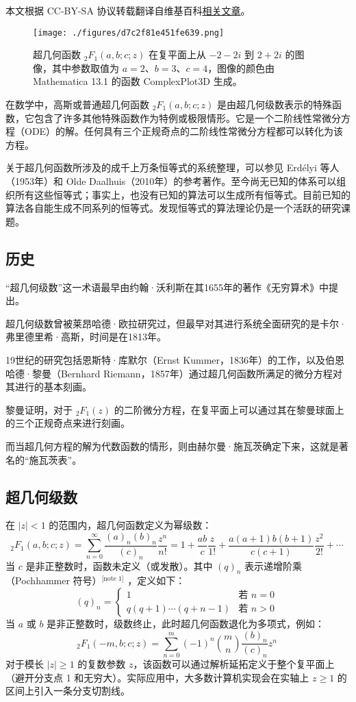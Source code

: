 
本文根据 CC-BY-SA 协议转载翻译自维基百科\href{https://en.wikipedia.org/wiki/Hypergeometric_function}{相关文章}。

\begin{figure}[ht]
\centering
\texttt{[image: ./figures/d7c2f81e451fe639.png]}
\caption{超几何函数 ${}_2F_1(a, b; c; z)$ 在复平面上从 $-2 - 2i$ 到 $2 + 2i$ 的图像，其中参数取值为 $a = 2$、$b = 3$、$c = 4$，图像的颜色由 Mathematica 13.1 的函数 ComplexPlot3D 生成。} \label{fig_CJHhs_1}
\end{figure}
在数学中，高斯或普通超几何函数 ${}_2F_1(a,b;c;z)$ 是由超几何级数表示的特殊函数，它包含了许多其他特殊函数作为特例或极限情形。它是一个二阶线性常微分方程（ODE）的解。任何具有三个正规奇点的二阶线性常微分方程都可以转化为该方程。

关于超几何函数所涉及的成千上万条恒等式的系统整理，可以参见 Erdélyi 等人（1953年）和 Olde Daalhuis（2010年）的参考著作。至今尚无已知的体系可以组织所有这些恒等式；事实上，也没有已知的算法可以生成所有恒等式。目前已知的算法各自能生成不同系列的恒等式。发现恒等式的算法理论仍是一个活跃的研究课题。
\subsection{历史}
“超几何级数”这一术语最早由约翰·沃利斯在其1655年的著作《无穷算术》中提出。

超几何级数曾被莱昂哈德·欧拉研究过，但最早对其进行系统全面研究的是卡尔·弗里德里希·高斯，时间是在1813年。

19世纪的研究包括恩斯特·库默尔（Ernst Kummer，1836年）的工作，以及伯恩哈德·黎曼（Bernhard Riemann，1857年）通过超几何函数所满足的微分方程对其进行的基本刻画。

黎曼证明，对于 ${}_2F_1(z)$ 的二阶微分方程，在复平面上可以通过其在黎曼球面上的三个正规奇点来进行刻画。

而当超几何方程的解为代数函数的情形，则由赫尔曼·施瓦茨确定下来，这就是著名的“施瓦茨表”。
\subsection{超几何级数}
在 $|z| < 1$ 的范围内，超几何函数定义为幂级数：
$$
{}_2F_1(a, b; c; z) = \sum_{n=0}^{\infty} \frac{(a)_n (b)_n}{(c)_n} \frac{z^n}{n!} = 1 + \frac{ab}{c} \frac{z}{1!} + \frac{a(a+1)b(b+1)}{c(c+1)} \frac{z^2}{2!} + \cdots~
$$
当 $c$ 是非正整数时，函数未定义（或发散）。其中 $(q)_n$ 表示递增阶乘（Pochhammer 符号）\(^\text{[note 1]}\) ，定义如下：
$$
(q)_n =
\begin{cases}
1 & \text{若 } n = 0 \\
q(q+1)\cdots(q+n-1) & \text{若 } n > 0
\end{cases}~
$$
当 $a$ 或 $b$ 是非正整数时，级数终止，此时超几何函数退化为多项式，例如：
$$
{}_2F_1(-m, b; c; z) = \sum_{n=0}^{m} (-1)^n \binom{m}{n} \frac{(b)_n}{(c)_n} z^n~
$$
对于模长 $|z| \geq 1$ 的复数参数 $z$，该函数可以通过解析延拓定义于整个复平面上（避开分支点 1 和无穷大）。实际应用中，大多数计算机实现会在实轴上 $z \geq 1$ 的区间上引入一条分支切割线。


